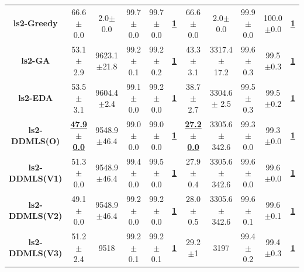 \documentclass[lettersize,journal]{IEEEtran}
\begin{document}
\begin{table}[!t]
{\begin{tabular}{ccccccccccc}
    \midrule
    {\bfseries ls2-Greedy} &66.6$\pm$0.0 &2.0$\pm$0.0 & 99.7$\pm$0.0 &99.7$\pm$0.0 &\underline{\bfseries 1} &66.6$\pm$0.0 &2.0$\pm$0.0& 99.9$\pm$0.0 &100.0$\pm$0.0 &\underline{\bfseries 1} \\
    {\bfseries ls2-GA} &53.1$\pm$2.9 &9623.1$\pm$21.8 & 99.2$\pm$0.1 &99.2$\pm$0.2 &\underline{\bfseries 1} &43.3$\pm$3.1 &3317.4$\pm$ 17.2& 99.6$\pm$0.3 &99.5$\pm$0.3 &\underline{\bfseries 1} \\
    {\bfseries ls2-EDA} &53.5$\pm$3.1 &9604.4$\pm$2.4 & 99.1$\pm$0.0 &99.2$\pm$0.0 &\underline{\bfseries 1} &38.7$\pm$2.7 &3304.6$\pm$ 2.5& 99.5$\pm$0.3 &99.5$\pm$0.2 &\underline{\bfseries 1} \\
    \bfseries ls2-DDMLS(O) &\underline{\bfseries 47.9$\pm$0.0} &9548.9$\pm$46.4 & 99.0$\pm$0.0 &99.0$\pm$0.0 &\underline{\bfseries 1} &\underline{\bfseries 27.2$\pm$0.0} &3305.6$\pm$342.6& 99.3$\pm$0.0 &99.3$\pm$0.0 &\underline{\bfseries 1} \\
    {\bfseries ls2-DDMLS(V1)} &51.3$\pm$0.0 &9548.9$\pm$46.4 & 99.4$\pm$0.0 &99.5$\pm$0.0 &\underline{\bfseries 1} &27.9$\pm$0.4 &3305.6$\pm$342.6& 99.6$\pm$0.0 &99.6$\pm$0.0 &\underline{\bfseries 1} \\
    {\bfseries ls2-DDMLS(V2)} &49.1$\pm$0.0 &9548.9$\pm$46.4 & 99.2$\pm$0.0 &99.2$\pm$0.0 &\underline{\bfseries 1} &28.0$\pm$0.5 &3305.6$\pm$342.6& 99.6$\pm$0.1 &99.6$\pm$0.1 &\underline{\bfseries 1} \\
    {\bfseries ls2-DDMLS(V3)} &51.2$\pm$2.4 &9518 & 99.2$\pm$0.1 &99.2$\pm$0.1 &\underline{\bfseries 1} &29.2$\pm$1 &3197& 99.4$\pm$0.2 &99.4$\pm$0.3 &\underline{\bfseries 1} \\
    

\end{tabular}}
\end{table}
\end{document}
